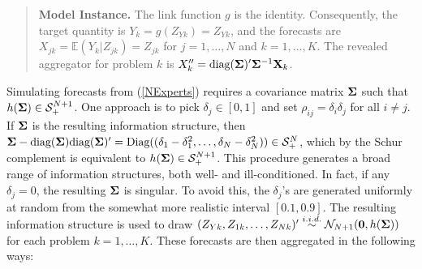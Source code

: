 \documentclass[11pt]{article}
\newcommand{\E}{\mathbb{E}}
\newtheorem{proposition}[theorem]{Proposition}
\theoremstyle{definition}
\theoremstyle{definition}
\def\bSigma{{\bf \Sigma}}
\def\X{{\bf X}}
\def\Z{{\bf Z}}
\def\E{{\mathbb E}}
\def\diag{\text{diag}}
\def\Diag{\text{Diag}}
\def\diag{\text{diag}}
\begin{document}
\begin{quote}
{\bf Model Instance.}  The link function $g$ is the identity. Consequently, the target quantity is $Y_k = g(Z_{Yk}) = Z_{Yk}$, and the forecasts are $X_{jk} = \E(Y_k | Z_{jk}) = Z_{jk}$ for $j = 1, \dots, N$ and $k = 1, \dots, K$. The revealed aggregator for problem $k$ is $X_k'' = \diag(\bSigma)' \bSigma^{-1} \X_k$. 
\end{quote}


Simulating forecasts from (\ref{NExperts}) requires a covariance matrix $\bSigma$ such that $h(\bSigma) \in \mathcal{S}_{+}^{N+1}$. 
One approach is to pick $\delta_j \in [0,1]$ and set $\rho_{ij} = \delta_i \delta_j$ for all $i \neq j$. If  $\bSigma$ is the resulting information structure, then $\bSigma - \diag(\bSigma)\diag(\bSigma)' = \Diag((\delta_1 - \delta_1^2, \dots, \delta_N - \delta_N^2)) \in \mathcal{S}_{+}^{N}$, which by the Schur complement is equivalent to $h(\bSigma) \in \mathcal{S}_{+}^{N+1}$. 
This procedure generates a broad range of information structures, both well- and ill-conditioned. In fact, if any $\delta_j = 0$, the resulting $\bSigma$ is singular.  To avoid this, the $\delta_j$'s are generated uniformly at random from the somewhat more realistic interval $[0.1, 0.9]$. The resulting information structure is used to draw $(Z_{Yk}, Z_{1k}, \dots, Z_{Nk})' \stackrel{i.i.d.}{\sim} \mathcal{N}_{N+1}(\boldsymbol{0}, h(\bSigma))$ for each problem $k = 1, \dots, K$. These forecasts are then aggregated in the following ways:
\end{document}
